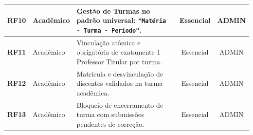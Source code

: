 \begin{table}[htb]
\begin{tabularx}{\textwidth}{l l X c c}
\midrule
\textbf{RF10} & Acadêmico & Gestão de Turmas no padrão universal: \texttt{"Matéria - Turma - Período"}. & Essencial & ADMIN \\
\midrule
\textbf{RF11} & Acadêmico & Vinculação atômica e obrigatória de exatamente 1 Professor Titular por turma. & Essencial & ADMIN \\
\midrule
\textbf{RF12} & Acadêmico & Matrícula e desvinculação de discentes validados na turma acadêmica. & Essencial & ADMIN \\
\midrule
\textbf{RF13} & Acadêmico & Bloqueio de encerramento de turma com submissões pendentes de correção. & Essencial & ADMIN \\
\bottomrule
\end{tabularx}
\end{table}

